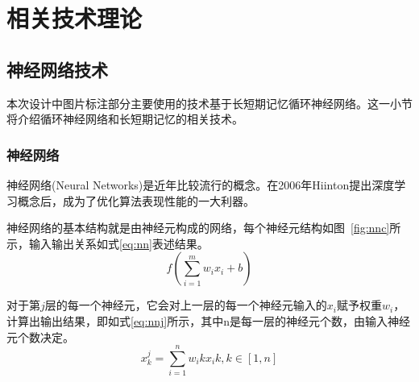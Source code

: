 
\chapter{相关技术理论}

\section{神经网络技术}
本次设计中图片标注部分主要使用的技术基于长短期记忆循环神经网络。这一小节将介绍循环神经网络和长短期记忆的相关技术。
\subsection{神经网络}
神经网络(Neural Networks)是近年比较流行的概念。在2006年Hiinton提出深度学习概念后，成为了优化算法表现性能的一大利器。

神经网络的基本结构就是由神经元构成的网络，每个神经元结构如图~\ref{fig:nnc}所示，输入输出关系如式\eqref{eq:nn}表述结果。
\begin{equation}
    \label{eq:nn}
    f( \sum\limits_{i=1}^{m} w_i x_i + b ) 
\end{equation}

对于第$j$层的每一个神经元，它会对上一层的每一个神经元输入的$x_i$赋予权重$w_i$，计算出输出结果，即如式\eqref{eq:nnj}所示，其中n是每一层的神经元个数，由输入神经元个数决定。
\begin{equation}
    \label{eq:nnj}
    x_k^j = \sum\limits_{i=1}^{n} w_ik x_ik, k\in \left[1,n\right]
\end{equation}

